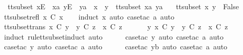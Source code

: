 \begin{isabellebody}
\ \ {\isachardoublequoteopen}tt{\isacharunderscore}subset\ {\isacharparenleft}{\isacharbrackleft}x{\isacharbrackright}\isactrlsub E\ {\isacharhash}\ xa{\isacharparenright}\ {\isacharparenleft}{\isacharbrackleft}y{\isacharbrackright}\isactrlsub E\ {\isacharhash}\ ya{\isacharparenright}\ {\isacharequal}\ {\isacharparenleft}x\ {\isacharequal}\ y\ {\isasymand}\ tt{\isacharunderscore}subset\ xa\ ya{\isacharparenright}{\isachardoublequoteclose}\ {\isacharbar}\isanewline
\ \ {\isachardoublequoteopen}tt{\isacharunderscore}subset\ x\ y\ {\isacharequal}\ False{\isachardoublequoteclose}\isanewline
\isanewline
{}\isamarkupfalse%
\ tt{\isacharunderscore}subset{\isacharunderscore}refl{\isacharcolon}\ {\isachardoublequoteopen}x\ {\isasymsubseteq}\isactrlsub C\ x{\isachardoublequoteclose}\isanewline
%
\isadelimproof
\ \ %
\endisadelimproof
%
\isatagproof
{}\isamarkupfalse%
\ {\isacharparenleft}induct\ x{\isacharcomma}\ auto{\isacharcomma}\ case{\isacharunderscore}tac\ a{\isacharcomma}\ auto{\isacharparenright}%
\endisatagproof
{\isafoldproof}%
%
\isadelimproof
\isanewline
%
\endisadelimproof
\isanewline
{}\isamarkupfalse%
\ tt{\isacharunderscore}subset{\isacharunderscore}trans{\isacharcolon}\ {\isachardoublequoteopen}x\ {\isasymsubseteq}\isactrlsub C\ y\ {\isasymLongrightarrow}\ y\ {\isasymsubseteq}\isactrlsub C\ z\ {\isasymLongrightarrow}\ x\ {\isasymsubseteq}\isactrlsub C\ z{\isachardoublequoteclose}\isanewline
%
\isadelimproof
%
\endisadelimproof
%
\isatagproof
{}\isamarkupfalse%
\ {\isacharminus}\isanewline
\ \ \isamarkupfalse%
\ {\isachardoublequoteopen}{\isasymexists}\ y{\isachardot}\ x\ {\isasymsubseteq}\isactrlsub C\ y\ {\isasymand}\ y\ {\isasymsubseteq}\isactrlsub C\ z\ {\isasymLongrightarrow}\ x\ {\isasymsubseteq}\isactrlsub C\ z{\isachardoublequoteclose}\isanewline
\ \ \ \ \isamarkupfalse%
\ {\isacharparenleft}induct\ rule{\isacharcolon}tt{\isacharunderscore}subset{\isachardot}induct{\isacharcomma}\ auto{\isacharparenright}\isanewline
\ \ \ \ \isamarkupfalse%
\ {\isacharparenleft}case{\isacharunderscore}tac\ y{\isacharcomma}\ auto{\isacharcomma}\ case{\isacharunderscore}tac\ a{\isacharcomma}\ auto{\isacharparenright}\isanewline
\ \ \ \ \isamarkupfalse%
\ {\isacharparenleft}case{\isacharunderscore}tac\ y{\isacharcomma}\ auto{\isacharcomma}\ case{\isacharunderscore}tac\ a{\isacharcomma}\ auto{\isacharparenright}\isanewline
\ \ \ \ \isamarkupfalse%
\ {\isacharparenleft}case{\isacharunderscore}tac\ yb{\isacharcomma}\ auto{\isacharcomma}\ case{\isacharunderscore}tac\ a{\isacharcomma}\ auto{\isacharparenright}\isanewline

\end{isabellebody}
